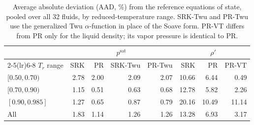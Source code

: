 \begin{table}[H]
\centering
\caption{Average absolute deviation (AAD, \%) from the reference equations of state, pooled over all 32 fluids, by reduced-temperature range. SRK-Twu and PR-Twu use the generalized Twu $\alpha$-function \cite{Twu1995a,Twu1995b} in place of the Soave form. PR-VT differs from PR only for the liquid density; its vapor pressure is identical to PR.}
\label{tab:bins}
\small
\begin{tabular}{lrrrrrrr}
\toprule
 & \multicolumn{4}{c}{$p^{\mathrm{sat}}$} & \multicolumn{3}{c}{$\rho'$} \\
\cmidrule(lr){2-5}\cmidrule(lr){6-8}
$T_r$ range & SRK & PR & SRK-Twu & PR-Twu & SRK & PR & PR-VT \\
\midrule
$[0.50,0.70)$ & 2.78 & 2.00 & 2.09 & 2.07 & 10.66 & 6.44 & 0.49 \\
$[0.70,0.90)$ & 1.15 & 0.51 & 0.63 & 0.68 & 12.78 & 5.82 & 2.26 \\
$[0.90,0.985]$ & 1.27 & 0.65 & 0.87 & 0.79 & 20.16 & 10.49 & 11.14 \\
\midrule
All & 1.83 & 1.14 & 1.26 & 1.26 & 13.28 & 6.93 & 3.17 \\
\bottomrule
\end{tabular}
\end{table}

